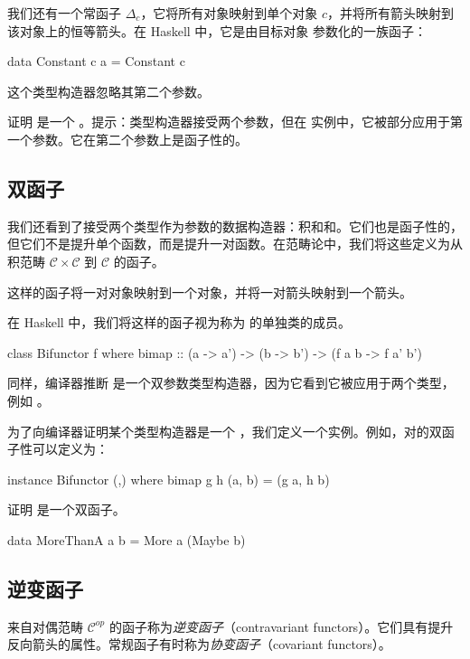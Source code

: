\documentclass[DaoFP]{subfiles}
\begin{document}
我们还有一个常函子 $\Delta_c$，它将所有对象映射到单个对象 $c$，并将所有箭头映射到该对象上的恒等箭头。在 Haskell 中，它是由目标对象  参数化的一族函子：
\begin{haskell}
data Constant c a = Constant c
\end{haskell}
这个类型构造器忽略其第二个参数。

\begin{exercise}
证明  是一个 。提示：类型构造器接受两个参数，但在  实例中，它被部分应用于第一个参数。它在第二个参数上是函子性的。
\end{exercise}

\subsection{双函子}

我们还看到了接受两个类型作为参数的数据构造器：积和和。它们也是函子性的，但它们不是提升单个函数，而是提升一对函数。在范畴论中，我们将这些定义为从积范畴 $\mathcal{C} \times \mathcal{C}$ 到 $\mathcal{C}$ 的函子。

这样的函子将一对对象映射到一个对象，并将一对箭头映射到一个箭头。

在 Haskell 中，我们将这样的函子视为称为  的单独类的成员。

\begin{haskell}
class Bifunctor f where
  bimap :: (a -> a') -> (b -> b') -> (f a b -> f a' b')
\end{haskell}
同样，编译器推断  是一个双参数类型构造器，因为它看到它被应用于两个类型，例如 。

为了向编译器证明某个类型构造器是一个 ，我们定义一个实例。例如，对的双函子性可以定义为：
\begin{haskell}
instance Bifunctor (,) where
  bimap g h (a, b) = (g a, h b)
\end{haskell}

\begin{exercise}
证明  是一个双函子。
\begin{haskell}
data MoreThanA a b = More a (Maybe b)
\end{haskell}
\end{exercise}

\subsection{逆变函子}

来自对偶范畴 $\mathcal{C}^{op}$ 的函子称为\emph{逆变函子}（contravariant functors）。它们具有提升反向箭头的属性。常规函子有时称为\emph{协变函子}（covariant functors）。
\end{document}
